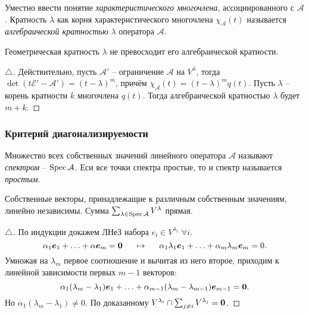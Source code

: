 Уместно ввести понятие \textit{характеристического многочлена}, ассоциированного с 
$\mathcal A $.  Кратность $\lambda $ как корня характеристического многочлена $\chi_{\mathcal A} (t)$ называется \textit{алгебраической кратностью} $\lambda $ оператора $\mathcal A $.

\begin{to_thr} 
     Геометрическая кратность $\lambda $ не превосходит его алгебраической кратности.
\end{to_thr}
 
\begin{proof}[$\triangle$]
Действительно, пусть $\mathcal A' $ -- ограничение $\mathcal A $ на $V^{\lambda} $, тогда $\det (t \mathcal E' - \mathcal A') = (t - \lambda)^m $, причём $\chi_{\mathcal A} (t) = (t-\lambda)^m q(t)$. Пусть $\lambda $ -- корень кратности $k $ многочлена $q(t) $. Тогда алгебраической кратностью $\lambda $ будет $m+k $.
\end{proof}


\subsubsection{Критерий диагонализируемости}

\begin{to_def} 
    Множество всех собственных значений линейного оператора $\mathcal A $ называют \textit{спектром} -- $\mathop{\mathrm{Spec}}\nolimits \mathcal A $. Еси все точки спектра простые, то и спектр называется \textit{простым}.
\end{to_def}

\begin{to_lem} 
\label{lem_1}
    Собственные векторы, принадлежащие к различным собственным значениям, линейно независимы. Сумма $\sum_{\lambda \in \mathop{\mathrm{Spec}}\nolimits \mathcal A} V^{\lambda}$ прямая. 
\end{to_lem}

\begin{proof}[$\triangle$]
    По индукции докажем ЛНеЗ набора $e_i \in V^{\lambda_i}$ $\forall i $. 
$$
    \alpha_1 \mbox{\boldmath $e$}_1 + \ldots + \alpha \mbox{\boldmath $e$}_m = \mbox{\boldmath $0$} \hspace{0.5cm} \mapsto \hspace{0.5cm} \alpha_1 \lambda_1 \mbox{\boldmath $e$}_1 + \ldots + \alpha_m \lambda_m \mbox{\boldmath $e$}_m = 0.
$$
Умножая на $\lambda_m $ первое соотношение и вычитая из него второе, приходим к линейной зависимости первых $m-1 $ векторов:
$$
    \alpha_1 (\lambda_m - \lambda_1) \mbox{\boldmath $e$}_1 + \ldots 
    + \alpha_{m-1} (\lambda_m - \lambda_{m-1}) \mbox{\boldmath $e$}_{m-1} = \mbox{\boldmath $0$}.
$$
Но $\alpha_1 (\lambda_m - \lambda_1) \neq 0$. По доказанному $V^{\lambda_i} \cap \sum_{j \neq i} V^{\lambda_j} = \mbox{\boldmath $0$} $.
\end{proof}

